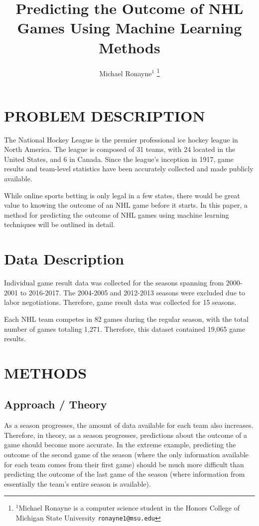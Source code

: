 \documentclass[letterpaper, 10 pt, conference]{ieeeconf}
\title{\LARGE \bf
Predicting the Outcome of NHL Games Using Machine Learning Methods
}
\author{Michael Ronayne$^{1}$%
\thanks{$^{1}$Michael Ronayne is a computer science student in the Honors College of Michigan State University
        {\tt\small ronayne1@msu.edu}}%
}
\begin{document}
\maketitle
\thispagestyle{empty}
\pagestyle{empty}


\section{PROBLEM DESCRIPTION}

The National Hockey League is the premier professional ice hockey league in North America. The league is composed of 31 teams, with 24 located in the United States, and 6 in Canada. Since the league's inception in 1917, game results and team-level statistics have been accurately collected and made publicly available.

While online sports betting is only legal in a few states, there would be great value to knowing the outcome of an NHL game before it starts. In this paper, a method for predicting the outcome of NHL games using machine learning techniques will be outlined in detail.

\section{Data Description}

Individual game result data was collected for the seasons spanning from 2000-2001 to 2016-2017. The 2004-2005 and 2012-2013 seasons were excluded due to labor negotiations. Therefore, game result data was collected for 15 seasons.

Each NHL team competes in 82 games during the regular season, with the total number of games totaling 1,271. Therefore, this dataset contained 19,065 game results. 

\section{METHODS}

\subsection{Approach / Theory}

As a season progresses, the amount of data available for each team also increases. Therefore, in theory, as a season progresses, predictions about the outcome of a game should become more accurate. In the extreme example, predicting the outcome of the second game of the season (where the only information available for each team comes from their first game) should be much more difficult than predicting the outcome of the last game of the season (where information from essentially the team's entire season is available).
\end{document}
